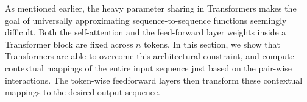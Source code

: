 



As mentioned earlier, the heavy parameter sharing in Transformers makes the goal of universally approximating sequence-to-sequence functions seemingly difficult. Both the self-attention and the feed-forward layer weights inside a Transformer block are fixed across $n$ tokens. In this section, we show that Transformers are able to overcome this architectural constraint, and compute contextual mappings of the entire input sequence just based on the pair-wise interactions. The token-wise feedforward layers then transform these contextual mappings to the desired output sequence. %


